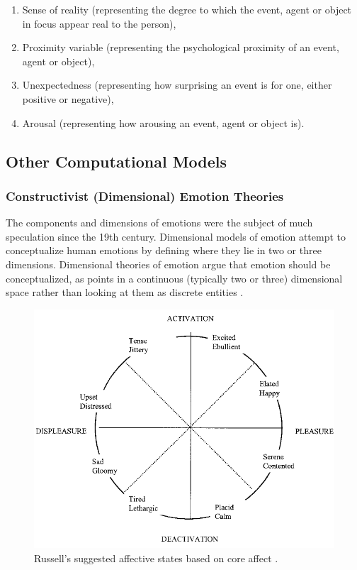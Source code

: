 \documentclass[12pt]{report}
\begin{document}
\begin{enumerate}
	\item Sense of reality (representing the degree to which the event, agent or
	object in focus appear real to the person),

	\item Proximity variable (representing the psychological proximity of an event,
	agent or object),

	\item Unexpectedness (representing how surprising an event is for one, either
	positive or negative),

	\item Arousal (representing how arousing an event, agent or object is).
\end{enumerate}

\subsection{Other Computational Models}

\subsubsection{Constructivist (Dimensional) Emotion Theories}
\label{sec:dimensional-emotions}

The components and dimensions of emotions were the subject of much speculation
since the 19th century. Dimensional models of emotion attempt to conceptualize
human emotions by defining where they lie in two or three dimensions.
Dimensional theories of emotion argue that emotion should be conceptualized, as
points in a continuous (typically two or three) dimensional space rather than
looking at them as discrete entities \cite{carver:affect-behavior}
\cite{mehrabian-russell:pad} \cite{russell:core-affect}
\cite{watson:consensual-structure-mood}.

\begin{figure}[tbh]
  \center
  \includegraphics[width=.7\textwidth]{figure/core-affect.png}
  \caption{Russell's suggested affective states based on core affect
  \cite{russell:core-affect}.}
  \label{fig:core-affect}
\end{figure}
\end{document}
